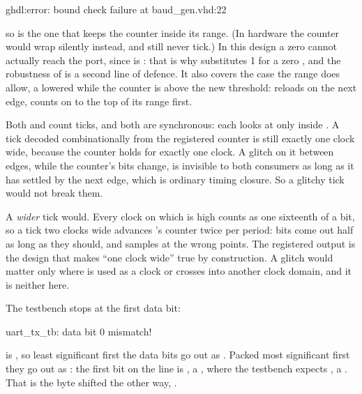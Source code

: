 \begin{console}
ghdl:error: bound check failure at baud_gen.vhd:22
\end{console}

\noindent so \code{>=} is the one that keeps the counter inside its range. (In hardware the counter
would wrap silently instead, and still never tick.) In this design a zero cannot actually reach the
port, since  is : that is why  substitutes
1 for a zero , and the robustness of \code{>=} is a second line of defence. It also
covers the case the range does allow, a  lowered while the counter is above the new
threshold: \code{>=} reloads on the next edge, \code{=} counts on to the top of its range first.

 Both  and  count ticks, and both are synchronous: each looks at
 only inside . A tick decoded combinationally from the
registered counter is still exactly one clock wide, because the counter holds  for
exactly one clock. A glitch on it between edges, while the counter's bits change, is invisible to
both consumers as long as it has settled by the next edge, which is ordinary timing closure. So a
glitchy tick would not break them.

A \emph{wider} tick would. Every clock on which  is high counts as one sixteenth of
a bit, so a tick two clocks wide advances 's  counter twice per period:
bits come out half as long as they should, and  samples at the wrong points. The
registered output is the design that makes ``one clock wide'' true by construction. A glitch would
matter only where  is used as a clock or crosses into another clock domain, and it is
neither here.

 The testbench stops at the first data bit:

\begin{console}
uart_tx_tb: data bit 0 mismatch!
\end{console}

\noindent {} is , so least significant first the data bits go out as
. Packed most significant first they go out as
: the first bit on the line is , a , where the
testbench expects , a . That is the byte shifted the other way, .


